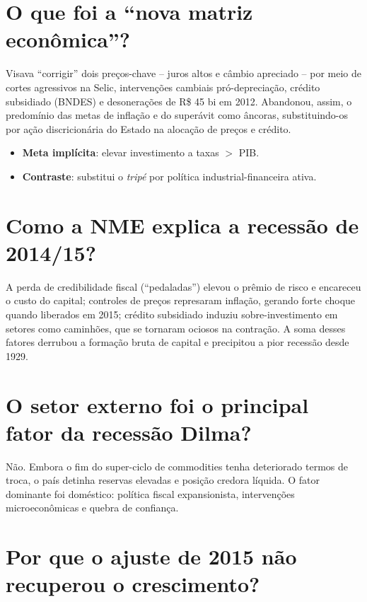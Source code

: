 \documentclass{sciposter}
\begin{document}
\begin{multicols}{3}
\section{\textbf{O que foi a “nova matriz econômica”?}}

Visava “corrigir” dois preços-chave – juros altos e câmbio apreciado – por meio de cortes agressivos na Selic, intervenções cambiais pró-depreciação, crédito subsidiado (BNDES) e desonerações de R\$ 45 bi em 2012. Abandonou, assim, o predomínio das metas de inflação e do superávit como âncoras, substituindo-os por ação discricionária do Estado na alocação de preços e crédito. 

\begin{itemize}
  \item \textbf{Meta implícita}: elevar investimento a taxas \(>\) PIB. 
  \item \textbf{Contraste}: substitui o \emph{tripé} por política industrial-financeira ativa.
\end{itemize}

\section{\textbf{Como a NME explica a recessão de 2014/15?}}

A perda de credibilidade fiscal (“pedaladas”) elevou o prêmio de risco e encareceu o custo do capital; controles de preços represaram inflação, gerando forte choque quando liberados em 2015; crédito subsidiado induziu sobre-investimento em setores como caminhões, que se tornaram ociosos na contração. A soma desses fatores derrubou a formação bruta de capital e precipitou a pior recessão desde 1929. 

\section{\textbf{O setor externo foi o principal fator da recessão Dilma?}}

Não. Embora o fim do super-ciclo de commodities tenha deteriorado termos de troca, o país detinha reservas elevadas e posição credora líquida. O fator dominante foi doméstico: política fiscal expansionista, intervenções microeconômicas e quebra de confiança. 

\section{\textbf{Por que o ajuste de 2015 não recuperou o crescimento?}}


\end{multicols}
\end{document}
